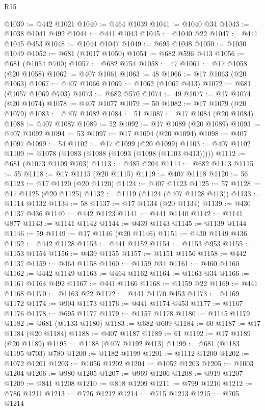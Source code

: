 \begin{lexlean}{R15}
\begin{coremodule}
@1039 := @442 @1021
@1040 := @464 @1039
@1041 := @1040 @34
@1043 := @1038 @1041 @492
@1044 := @441 @1043
@1045 := @1040 @22
@1047 := @441 @1045 @453
@1048 := @1044 @1047
@1049 := @695 @1048
@1050 := @1030 @1049
@1052 := @681 (@1017 @1050)
@1054 := @682 @596 @413
@1056 := @681 (@1054 @700)
@1057 := @682 @754
@1058 := 47
@1061 := @17 @1058 (@20 @1058)
@1062 := @407 @1061
@1063 := 48
@1066 := @17 @1063 (@20 @1063)
@1067 := @407 @1066
@1069 := @1062 (@1067 @413)
@1072 := @681 (@1057 @1069 @703)
@1073 := @682 @570
@1074 := 49
@1077 := @17 @1074 (@20 @1074)
@1078 := @407 @1077
@1079 := 50
@1082 := @17 @1079 (@20 @1079)
@1083 := @407 @1082
@1084 := 51
@1087 := @17 @1084 (@20 @1084)
@1088 := @407 @1087
@1089 := 52
@1092 := @17 @1089 (@20 @1089)
@1093 := @407 @1092
@1094 := 53
@1097 := @17 @1094 (@20 @1094)
@1098 := @407 @1097
@1099 := 54
@1102 := @17 @1099 (@20 @1099)
@1103 := @407 @1102
@1109 := @1078 (@1083 (@1088 (@1093 (@1098 (@1103 @413)))))
@1112 := @681 (@1073 @1109 @703)
@1113 := @485 @204
@1114 := @682 @1113
@1115 := 55
@1118 := @17 @1115 (@20 @1115)
@1119 := @407 @1118
@1120 := 56
@1123 := @17 @1120 (@20 @1120)
@1124 := @407 @1123
@1125 := 57
@1128 := @17 @1125 (@20 @1125)
@1132 := @1119 (@1124 (@407 @1128 @413))
@1133 := @1114 @1132
@1134 := 58
@1137 := @17 @1134 (@20 @1134)
@1139 := @430 @1137 @436
@1140 := @442 @1123
@1141 := @441 @1140
@1142 := @1141 @877
@1143 := @1141 @1142
@1144 := @439 @1143
@1145 := @1139 @1144
@1146 := 59
@1149 := @17 @1146 (@20 @1146)
@1151 := @430 @1149 @436
@1152 := @442 @1128
@1153 := @441 @1152
@1154 := @1153 @953
@1155 := @1153 @1154
@1156 := @439 @1155
@1157 := @1151 @1156
@1158 := @442 @1137
@1159 := @464 @1158
@1160 := @1159 @34
@1161 := @460 @1160
@1162 := @442 @1149
@1163 := @464 @1162
@1164 := @1163 @34
@1166 := @1161 @1164 @492
@1167 := @441 @1166
@1168 := @1159 @22
@1169 := @441 @1168
@1170 := @1163 @22
@1172 := @441 @1170 @453
@1173 := @1169 @1172
@1174 := @904 @1173
@1176 := @441 @1174 @453
@1177 := @1167 @1176
@1178 := @695 @1177
@1179 := @1157 @1178
@1180 := @1145 @1179
@1182 := @681 (@1133 @1180)
@1183 := @682 @609
@1184 := 60
@1187 := @17 @1184 (@20 @1184)
@1188 := @407 @1187
@1189 := 61
@1192 := @17 @1189 (@20 @1189)
@1195 := @1188 (@407 @1192 @413)
@1199 := @681 (@1183 @1195 @703) @780
@1200 := @1182 @1199
@1201 := @1112 @1200
@1202 := @1072 @1201
@1203 := @1056 @1202
@1204 := @1052 @1203
@1205 := @1003 @1204
@1206 := @980 @1205
@1207 := @969 @1206
@1208 := @919 @1207
@1209 := @841 @1208
@1210 := @818 @1209
@1211 := @799 @1210
@1212 := @786 @1211
@1213 := @726 @1212
@1214 := @715 @1213
@1215 := @705 @1214

\end{coremodule}
\end{lexlean}
